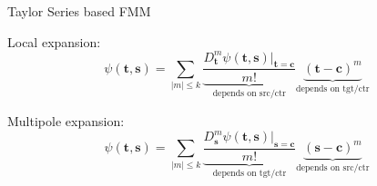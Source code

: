 \documentclass[10pt,usenames,dvipsnames]{beamer}
\def\b#1{\mathbf{ #1}}
\begin{document}
%
%
%
%
%
%
%
%
%
%
%


 \begin{frame}[fragile]{Taylor Series based FMM}
 
 Local expansion:
 \[
  \psi(\b t, \b s) = \sum_{|m| \le k} \underbrace{\frac{D_{\b t}^m \psi(\b t, \b s)\Bigr|_{\b t = \b c}}{m!}}_{\text{depends on src/ctr}} \underbrace{(\b t - \b       c)^m}_{\text{depends on tgt/ctr}}
 \]
 
 Multipole expansion:
 \[
  \psi(\b t, \b s) = \sum_{|m| \le k} \underbrace{\frac{D_{\b s}^m \psi(\b t, \b s)\Bigr|_{\b s = \b c}}{m!}}_{\text{depends on tgt/ctr}} \underbrace{(\b s - \b       c)^m}_{\text{depends on src/ctr}}
 \]
 \end{frame}
\end{document}
